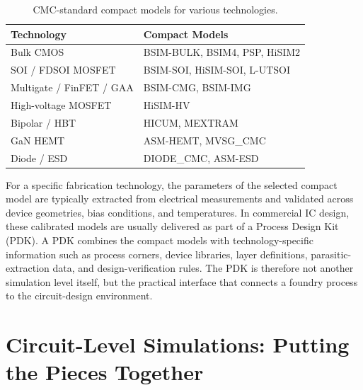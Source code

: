 \documentclass[10pt,a4paper]{article}
\begin{document}
	\begin{table}[htbp]
		
		\centering
		
		\begin{tabular}{@{}ll@{}}
			
			\toprule
			
			\textbf{Technology}
			&
			\textbf{Compact Models}
			\\
			
			\midrule
			
			Bulk CMOS
			& BSIM-BULK, BSIM4, PSP, HiSIM2 \\
			
			SOI / FDSOI MOSFET
			& BSIM-SOI, HiSIM-SOI, L-UTSOI \\
			
			Multigate / FinFET / GAA
			& BSIM-CMG, BSIM-IMG \\
			
			High-voltage MOSFET
			& HiSIM-HV \\
			
			Bipolar / HBT
			& HICUM, MEXTRAM \\
			
			GaN HEMT
			& ASM-HEMT, MVSG\_CMC \\
			
			Diode / ESD
			& DIODE\_CMC, ASM-ESD \\
			
			\bottomrule
			
		\end{tabular}
		
		\caption{
			CMC-standard compact models for various technologies.
		}
		\label{tab:tab1}
	\end{table}
	
	For a specific fabrication technology, the parameters of the selected compact model are typically extracted from electrical measurements and validated across device geometries, bias conditions, and temperatures. In commercial IC design, these calibrated models are usually delivered as part of a Process Design Kit (PDK). A PDK combines the compact models with technology-specific information such as process corners, device libraries, layer definitions, parasitic-extraction data, and design-verification rules. The PDK is therefore not another simulation level itself, but the practical interface that connects a foundry process to the circuit-design environment.
	
	\section{Circuit-Level Simulations: Putting the Pieces Together}
	
\end{document}
